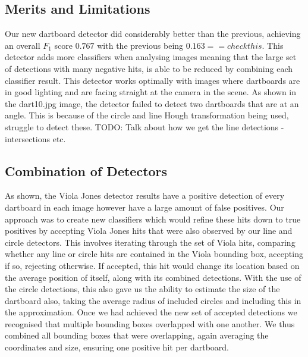 \documentclass[a4paper]{article}
\begin{document}
\subsection*{Merits and Limitations}
Our new dartboard detector did considerably better than the previous, achieving
an overall \(F_{1}\) score ${0.767}$ with the previous being ${0.163 == check
this}$. This detector adds more classifiers when analysing images meaning that
the large set of detections with many negative hits, is able to be reduced by
combining each classifier result. This detector works optimally with images
where dartboards are in good lighting and are facing straight at the camera in
the scene. As shown in the dart10.jpg image, the detector failed to detect two
dartboards that are at an angle. This is because of the circle and line Hough
transformation being used, struggle to detect these.
TODO: Talk about how we get the line detections - intersections etc.

\subsection*{Combination of Detectors}
\begin{figure}[H]
  \centering
\end{figure}

As shown, the Viola Jones detector results have a positive detection of every
dartboard in each image however have a large amount of false positives. Our
approach was to create new classifiers which would refine these hits down to
true positives by accepting Viola Jones hits that were also observed by our
line and circle detectors. This involves iterating through the set of Viola
hits, comparing whether any line or circle hits are contained in the Viola
bounding box, accepting if so, rejecting otherwise. If accepted, this hit would
change its location based on the average position of itself, along with its
combined detections. With the use of the circle detections, this also gave us
the ability to estimate the size of the dartboard also, taking the average
radius of included circles and including this in the approximation.  Once we
had achieved the new set of accepted detections we recognised that multiple
bounding boxes overlapped with one another. We thus combined all bounding boxes
that were overlapping, again averaging the coordinates and size, ensuring one
positive hit per dartboard.
\end{document}
